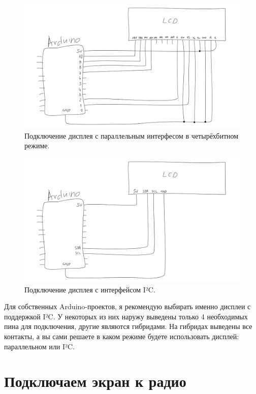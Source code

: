 \begin{figure}
  \centering
  \includegraphics{sketches/text-lcd-parallel-4}
  \caption{Подключение дисплея с параллельным интерфесом в четырёхбитном режиме.}
  \label{fig:text-lcd-parallel-4}
\end{figure}

\begin{figure}
  \centering
  \includegraphics{sketches/text-lcd-i2c}
  \caption{Подключение дисплея с интерфейсом I²C.}
  \label{fig:text-lcd-i2c}
\end{figure}

Для собственных Arduino-проектов, я рекомендую выбирать именно дисплеи с поддержкой I²C. У некоторых из них наружу выведены только 4 необходимых пина для подключения, другие являются гибридами. На гибридах выведены все контакты, а вы сами решаете в каком режиме будете использовать дисплей: параллельном или I²C.

\section{Подключаем экран к радио}

